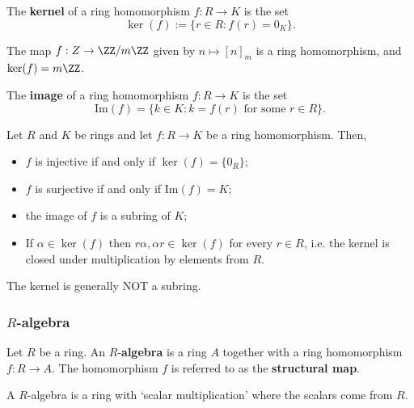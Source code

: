 \documentclass[12pt, a4paper]{article}
\begin{document}
\begin{definition}
    The \textbf{kernel} of a ring homomorphism \(f:R \to K\) is the set 
    \[\ker(f) := \{r \in R :f(r)=0_K\}.\]
\end{definition}

\begin{example}
    The map \(f:Z \to \ZZ/m\ZZ\) given by \(n \mapsto [n]_m\) is a ring homomorphism, and \(\ker(f)=m\ZZ\).
\end{example}

\begin{definition}
    The \textbf{image} of a ring homomorphism \(f:R \to K\) is the set 
    \[\text{Im}(f) =\{ k \in K :k=f(r) \text{ for some } r\in R\}.\]
\end{definition}

\begin{proposition}
    Let \(R\) and \(K\) be rings and let \(f:R\to K\) be a ring homomorphism. Then,
    \begin{itemize}
        \item \(f\) is injective if and only if \(\ker(f)=\{0_R\}\);
        \item \(f\) is surjective if and only if \(\text{Im}(f)=K\);
        \item the image of \(f\) is a subring of \(K\);
        \item If \(\alpha \in \ker(f)\) then \(r\alpha, \alpha r\in \ker(f)\) for every \(r \in R\), i.e. the kernel is closed under multiplication by elements from \(R\).
    \end{itemize}
\end{proposition}

\begin{mdremark}
    The kernel is generally NOT a subring.
\end{mdremark}

\subsubsection{\texorpdfstring{\(R\)-algebra}{TEXT}}

\begin{definition}
    Let \(R\) be a ring. An \(R\)-\textbf{algebra} is a ring \(A\) together with a ring homomorphism \(f:R\to A\). The homomorphism \(f\) is referred to as the \textbf{structural map}.
\end{definition}

\begin{mdnote}
    A \(R\)-algebra is a ring with `scalar multiplication' where the scalars come from \(R\).
\end{mdnote}
\end{document}
